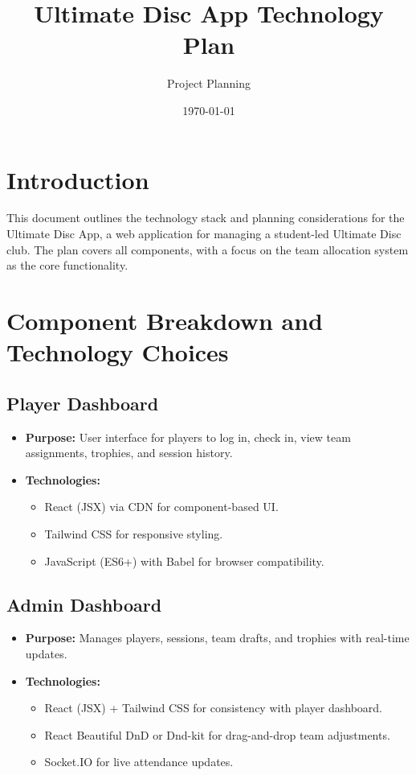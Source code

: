 \documentclass{article}
\title{Ultimate Disc App Technology Plan}
\author{Project Planning}
\date{\today}
\begin{document}
\maketitle

\section{Introduction}
This document outlines the technology stack and planning considerations for the Ultimate Disc App, a web application for managing a student-led Ultimate Disc club. The plan covers all components, with a focus on the team allocation system as the core functionality.

\section{Component Breakdown and Technology Choices}

\subsection{Player Dashboard}
\begin{itemize}
    \item \textbf{Purpose:} User interface for players to log in, check in, view team assignments, trophies, and session history.
    \item \textbf{Technologies:}
    \begin{itemize}
        \item React (JSX) via CDN for component-based UI.
        \item Tailwind CSS for responsive styling.
        \item JavaScript (ES6+) with Babel for browser compatibility.
    \end{itemize}
\end{itemize}

\subsection{Admin Dashboard}
\begin{itemize}
    \item \textbf{Purpose:} Manages players, sessions, team drafts, and trophies with real-time updates.
    \item \textbf{Technologies:}
    \begin{itemize}
        \item React (JSX) + Tailwind CSS for consistency with player dashboard.
        \item React Beautiful DnD or Dnd-kit for drag-and-drop team adjustments.
        \item Socket.IO for live attendance updates.
    \end{itemize}
\end{itemize}
\end{document}
